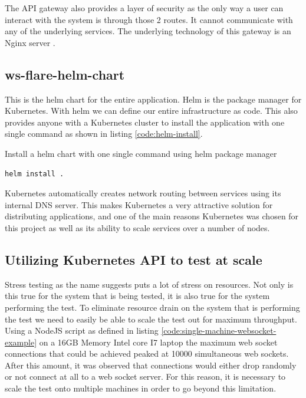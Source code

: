The API gateway also provides a layer of security as the only way a user can interact with the system is through those 2 routes. It cannot communicate with any of the underlying services. The underlying technology of this gateway is an Nginx server \cite{nginx}.

\subsection{ws-flare-helm-chart}

This is the helm chart for the entire application. Helm is the package manager for Kubernetes. With helm we can define our entire infrastructure as code. This also provides anyone with a Kubernetes cluster to install the application with one single command as shown in listing \ref{code:helm-install}.

\begin{listing}[H]
    \caption{Install a helm chart with one single command using helm package manager}
    \label{code:helm-install}
    \begin{verbatim}
helm install .
\end{verbatim}
\end{listing}

Kubernetes automatically creates network routing between services using its internal DNS server. This makes Kubernetes a very attractive solution for distributing applications, and one of the main reasons Kubernetes was chosen for this project as well as its ability to scale services over a number of nodes.

\subsection{Utilizing Kubernetes API to test at scale}

Stress testing as the name suggests puts a lot of stress on resources. Not only is this true for the system that is being tested, it is also true for the system performing the test. To eliminate resource drain on the system that is performing the test we need to easily be able to scale the test out for maximum throughput. Using a NodeJS script as defined in listing \ref{code:single-machine-websocket-example} on a 16GB Memory Intel core I7 laptop the maximum web socket connections that could be achieved peaked at 10000 simultaneous web sockets. After this amount, it was observed that connections would either drop randomly or not connect at all to a web socket server. For this reason, it is necessary to scale the test onto multiple machines in order to go beyond this limitation.

